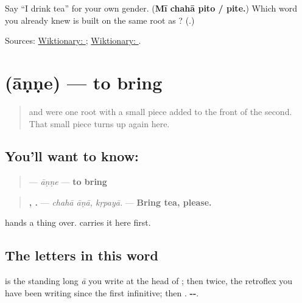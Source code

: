 \begin{tcolorbox}[breakable,colback=teal!4,colframe=teal!35!black,title={Before you move on}]
Say \textquotedblleft{}I drink tea\textquotedblright{} for your own gender. (\textbf{Mī chahā pito / pite.}) Which word you already knew is built on the same root as \textbf{}? (\textbf{}.)

Sources: \href{https://en.wiktionary.org/wiki/\%E0\%A4\%AA\%E0\%A4\%BF\%E0\%A4\%A3\%E0\%A5\%87}{Wiktionary: }; \href{https://en.wiktionary.org/wiki/\%E0\%A4\%AA\%E0\%A4\%BF\%E0\%A4\%AC\%E0\%A4\%A4\%E0\%A4\%BF}{Wiktionary: }.
\end{tcolorbox}
\section[\texorpdfstring{\mr{आणणे} (āṇṇe)}{आणणे (āṇṇe)}]{ (āṇṇe) — to bring}

\label{lesson:MR-C22-anne}



\begin{quote}
\textbf{} and \textbf{} were one root with a small piece added to the front of the second. That small piece turns up again here.
\end{quote}

\subsection*{You'll want to know: }
\begin{quote}
\textbf{} — \emph{āṇṇe} — \textbf{to bring}
\end{quote}

\begin{quote}
\textbf{ , .} — \emph{chahā āṇā, kṛpayā.} — \textbf{Bring tea, please.}
\end{quote}

\textbf{} hands a thing over. \textbf{} carries it here first.

\subsection*{The letters in this word}
\textbf{} is the standing long \emph{ā} you write at the head of \textbf{}; then \textbf{} twice, the retroflex you have been writing since the first infinitive; then \textbf{}. \textbf{--}.

